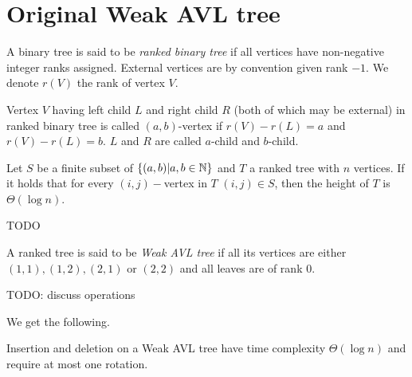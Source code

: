 \section{Original Weak AVL tree}

\begin{defn}
A binary tree is said to be {\em ranked binary tree} if all vertices have non-negative integer ranks assigned. External vertices are by convention given rank $-1$. We denote $r(V)$ the rank of vertex $V$.
\end{defn}

\begin{defn}
Vertex $V$ having left child $L$ and right child $R$ (both of which may be external) in ranked binary tree is called $(a,b)$-vertex if $r(V) - r(L) = a$ and $r(V) - r(L) = b$. $L$ and $R$ are called $a$-child and $b$-child.
\end{defn}

\begin{thm}
Let $S$ be a finite subset of $\{ (a,b) | a,b \in \mathbb{N} \}$ and $T$ a ranked tree with $n$ vertices. If it holds that for every $(i,j)-$vertex in $T$ $(i,j) \in S$, then the height of $T$ is $\Theta(\log n)$.
\end{thm}

\begin{myproof}
TODO
\end{myproof}

\begin{defn}
A ranked tree is said to be {\em Weak AVL tree} if all its vertices are either $(1,1), (1,2), (2,1)$ or $(2,2)$ and all leaves are of rank 0.
\end{defn}

TODO: discuss operations

We get the following.

\begin{prop}
Insertion and deletion on a Weak AVL tree have time complexity $\Theta(\log n)$ and require at most one rotation.
\end{prop}
